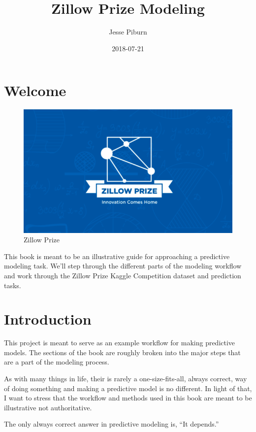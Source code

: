 \documentclass[]{book}
\title{Zillow Prize Modeling}
\author{Jesse Piburn}
\date{2018-07-21}
\theoremstyle{definition}
\theoremstyle{definition}
\theoremstyle{definition}
\theoremstyle{remark}
\begin{document}
\maketitle

{
\setcounter{tocdepth}{1}
\tableofcontents
}
\chapter*{Welcome}\label{welcome}

\begin{figure}
\centering
\includegraphics{zillowprize-png.png}
\caption{Zillow Prize}
\end{figure}

This book is meant to be an illustrative guide for approaching a
predictive modeling task. We'll step through the different parts of the
modeling workflow and work through the Zillow Prize Kaggle Competition
dataset and prediction tasks.

\chapter{Introduction}\label{intro}

This project is meant to serve as an example workflow for making
predictive models. The sections of the book are roughly broken into the
major steps that are a part of the modeling process.

As with many things in life, their is rarely a one-size-fits-all, always
correct, way of doing something and making a predictive model is no
different. In light of that, I want to stress that the workflow and
methods used in this book are meant to be illustrative not
authoritative.

The only always correct answer in predictive modeling is, ``It
depends.''
\end{document}
